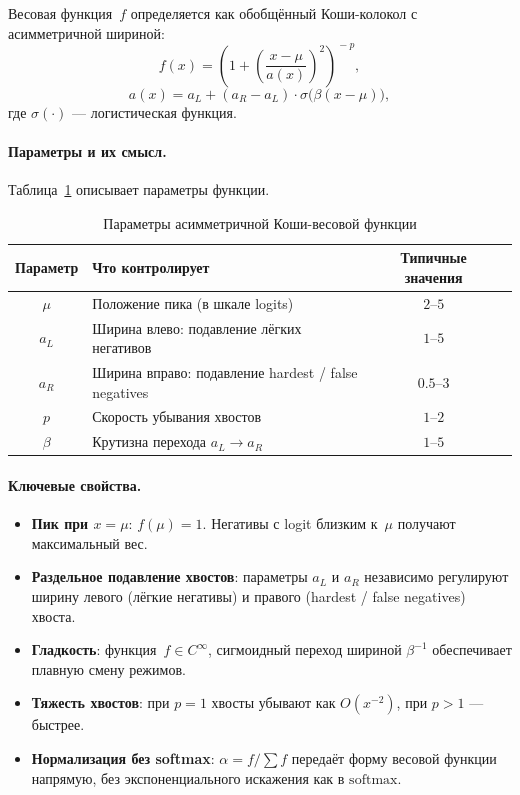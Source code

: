 Весовая функция~$f$ определяется как обобщённый Коши-колокол с асимметричной шириной:
\begin{equation}
  f(x)
  = \left(1 + \left(\frac{x - \mu}{a(x)}\right)^{\!2}\right)^{\!-p},
  \label{eq:cauchy_bell}
\end{equation}
\begin{equation}
  a(x) = a_L + (a_R - a_L)\cdot\sigma\!\bigl(\beta(x - \mu)\bigr),
  \label{eq:asymmetric_width}
\end{equation}
где $\sigma(\cdot)$ --- логистическая функция.

\paragraph{Параметры и их смысл.} Таблица~\ref{tab:cauchy_params} описывает параметры функции.

\begin{table}[h]
\centering
\caption{Параметры асимметричной Коши-весовой функции}
\label{tab:cauchy_params}
\begin{tabular}{clcc}
\hline
Параметр & Что контролирует & Типичные значения \\
\hline
$\mu$    & Положение пика (в шкале logits) & $2$--$5$ \\
$a_L$    & Ширина влево: подавление лёгких негативов & $1$--$5$ \\
$a_R$    & Ширина вправо: подавление hardest / false negatives & $0.5$--$3$ \\
$p$      & Скорость убывания хвостов & $1$--$2$ \\
$\beta$  & Крутизна перехода $a_L \to a_R$ & $1$--$5$ \\
\hline
\end{tabular}
\end{table}

\paragraph{Ключевые свойства.}
\begin{itemize}
  \item \textbf{Пик при $x = \mu$}: $f(\mu) = 1$. Негативы с logit близким к~$\mu$ получают
        максимальный вес.
  \item \textbf{Раздельное подавление хвостов}: параметры $a_L$ и $a_R$ независимо регулируют
        ширину левого (лёгкие негативы) и правого (hardest / false negatives) хвоста.
  \item \textbf{Гладкость}: функция~$f \in C^\infty$, сигмоидный переход шириной $\beta^{-1}$
        обеспечивает плавную смену режимов.
  \item \textbf{Тяжесть хвостов}: при $p=1$ хвосты убывают как $O(x^{-2})$, при $p>1$ ---
        быстрее.
  \item \textbf{Нормализация без softmax}: $\alpha = f / \sum f$ передаёт форму весовой функции
        напрямую, без экспоненциального искажения как в $\mathrm{softmax}$.
\end{itemize}

